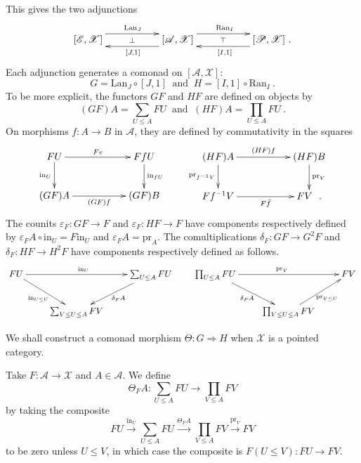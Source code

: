 \documentclass[a4paper,12pt,reqno]{amsart}
\theoremstyle{definition}
\theoremstyle{fact}
\theoremstyle{genquest}
\theoremstyle{step}
\newcommand{\dd}{\colon}
\newcommand{\lra}{\longrightarrow}
\newcommand{\ra}{\rightarrow}
\def\CA{{\mathscr A}}
\def\CE{{\mathscr E}}
\def\CP{{\mathscr P}}
\def\CX{{\mathscr X}}
\begin{document}
This gives the two adjunctions
\begin{equation}\label{twoadj} 
\xymatrix @R-3mm {
[\CE,\CX] \ar@<1.5ex>[rr]^{\mathrm{Lan}_J} \ar@{}[rr]|-{\bot} && [\CA,\CX]
\ar@<1.5ex>[rr]^{\mathrm{Ran}_I}  \ar@{}[rr]|-{\top} \ar@<1.5ex>[ll]^{[J,1]} && [\CP,\CX]
\ar@<1.5ex>[ll]^{[I,1]}  \ .
}
\end{equation}
Each adjunction generates a comonad on $[\CA,\CX]$:
\begin{equation}\label{twocmnd}
G = \mathrm{Lan}_J \circ [J,1] \ \text{ and } \  H = [I,1] \circ \mathrm{Ran}_I \ .
\end{equation}
To be more explicit, the functors $GF$ and $HF$ are defined on objects by 
$$(GF)A=\sum_{U\le A}{FU} \ \text{ and } \ (HF)A=\prod_{U\le A}{FU} \ .$$ 
On morphisms $f\dd A\ra B$ in $\CA$, they are defined by commutativity in the squares
\begin{equation}
\begin{aligned}
\xymatrix{
FU \ar[rr]^-{Fe} \ar[d]_-{\mathrm{in}_U} && FfU \ar[d]^-{\mathrm{in}_{fU}} \\
(GF)A \ar[rr]_-{(GF)f} && (GF)B}
\qquad
\xymatrix{
(HF)A \ar[rr]^-{(HF)f} \ar[d]_-{\mathrm{pr}_{f^{-1}V}} && (HF)B \ar[d]^-{\mathrm{pr}_V} \\
Ff^{-1}V \ar[rr]_-{F\bar{f}} && FV \ \ .}
\end{aligned}
\end{equation}
The counits $\varepsilon_F \dd GF \ra F$ and $\varepsilon_F \dd HF \ra F$ have
components respectively defined by $\varepsilon_FA \circ \mathrm{in}_U = F\mathrm{in}_U$
and $\varepsilon_FA = \mathrm{pr}_A$. 
The comultiplications $\delta_F \dd GF\ra G^2F$ and $\delta_F \dd HF\ra H^2F$ 
have components respectively defined as follows.
\begin{equation*}
\xymatrix{
FU \ar[rd]_{\mathrm{in}_{U\le U}}\ar[rr]^{\mathrm{in}_U}   && \sum_{U\le A}{FU} \ar[ld]^{\delta_FA} \\
& \sum_{V\le U\le A}{FV}  &
}
\qquad
\xymatrix{
\prod_{U\le A}{FU} \ar[rd]_{\delta_FA}\ar[rr]^{\mathrm{pr}_{V}}   && FV  \\
& \prod_{V\le U\le A}{FV}\ar[ru]_{\mathrm{pr}_{V\le U}}  &
}
\end{equation*}


We shall construct a comonad morphism $\Theta \dd G \Rightarrow H$ when $\CX$ is a pointed
category.

Take $F : \CA \lra \CX$ and $A\in \CA$. We define 
\begin{equation}\label{Thetacmpnt}
\Theta_FA : \sum_{U\le A}FU \lra \prod_{V\le A}FV
\end{equation}
by taking the composite
$$ FU\stackrel{\mathrm{in}_U}\lra \sum_{U\le A}{FU} \stackrel{\Theta_FA}\lra \prod_{V\le A}{FV} \stackrel{\mathrm{pr}_V}\lra FV$$
to be zero unless $U\le V$, in which case the composite is $F(U\le V) \dd FU \ra FV$.
\end{document}
